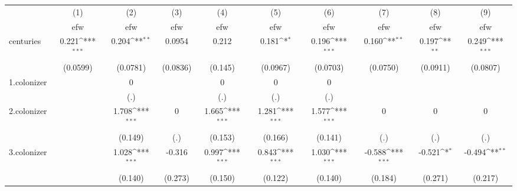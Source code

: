 {
\def\sym#1{\ifmmode^{#1}\else\(^{#1}\)\fi}
\begin{tabular}{l*{9}{c}}
\hline\hline
            &\multicolumn{1}{c}{(1)}&\multicolumn{1}{c}{(2)}&\multicolumn{1}{c}{(3)}&\multicolumn{1}{c}{(4)}&\multicolumn{1}{c}{(5)}&\multicolumn{1}{c}{(6)}&\multicolumn{1}{c}{(7)}&\multicolumn{1}{c}{(8)}&\multicolumn{1}{c}{(9)}\\
            &\multicolumn{1}{c}{efw}&\multicolumn{1}{c}{efw}&\multicolumn{1}{c}{efw}&\multicolumn{1}{c}{efw}&\multicolumn{1}{c}{efw}&\multicolumn{1}{c}{efw}&\multicolumn{1}{c}{efw}&\multicolumn{1}{c}{efw}&\multicolumn{1}{c}{efw}\\
\hline
centuries   &       0.221\sym{***}&       0.204\sym{**} &      0.0954         &       0.212         &       0.181\sym{*}  &       0.196\sym{***}&       0.160\sym{**} &       0.197\sym{**} &       0.249\sym{***}\\
            &    (0.0599)         &    (0.0781)         &    (0.0836)         &     (0.145)         &    (0.0967)         &    (0.0703)         &    (0.0750)         &    (0.0911)         &    (0.0807)         \\
[1em]
1.colonizer &                     &           0         &                     &           0         &           0         &           0         &                     &                     &                     \\
            &                     &         (.)         &                     &         (.)         &         (.)         &         (.)         &                     &                     &                     \\
[1em]
2.colonizer &                     &       1.708\sym{***}&           0         &       1.665\sym{***}&       1.281\sym{***}&       1.577\sym{***}&           0         &           0         &           0         \\
            &                     &     (0.149)         &         (.)         &     (0.153)         &     (0.166)         &     (0.141)         &         (.)         &         (.)         &         (.)         \\
[1em]
3.colonizer &                     &       1.028\sym{***}&      -0.316         &       0.997\sym{***}&       0.843\sym{***}&       1.030\sym{***}&      -0.588\sym{***}&      -0.521\sym{*}  &      -0.494\sym{**} \\
            &                     &     (0.140)         &     (0.273)         &     (0.150)         &     (0.122)         &     (0.140)         &     (0.184)         &     (0.271)         &     (0.217)         \\

\end{tabular}}
